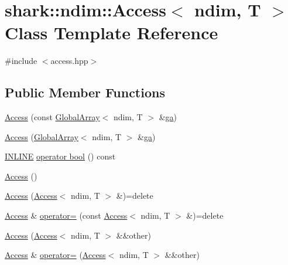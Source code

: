 \hypertarget{classshark_1_1ndim_1_1_access}{}\section{shark\+:\+:ndim\+:\+:Access$<$ ndim, T $>$ Class Template Reference}
\label{classshark_1_1ndim_1_1_access}


{\ttfamily \#include $<$access.\+hpp$>$}

\subsection*{Public Member Functions}
\begin{DoxyCompactItemize}
\item 
\hyperlink{classshark_1_1ndim_1_1_access_a4d5c793cce84924fc4f8a0f8ce0ac780}{Access} (const \hyperlink{classshark_1_1ndim_1_1_global_array}{Global\+Array}$<$ ndim, T $>$ \&\hyperlink{classshark_1_1ndim_1_1_access_abc59e261a07fcecc3f1db641ef04efa7}{ga})
\item 
\hyperlink{classshark_1_1ndim_1_1_access_a228d7e275cbb011b48e6d7cb76f8479d}{Access} (\hyperlink{classshark_1_1ndim_1_1_global_array}{Global\+Array}$<$ ndim, T $>$ \&\hyperlink{classshark_1_1ndim_1_1_access_abc59e261a07fcecc3f1db641ef04efa7}{ga})
\item 
\hyperlink{common_8hpp_a2eb6f9e0395b47b8d5e3eeae4fe0c116}{I\+N\+L\+I\+NE} \hyperlink{classshark_1_1ndim_1_1_access_af1f5644abd12d6affaf5f52db26ce512}{operator bool} () const
\item 
\hyperlink{classshark_1_1ndim_1_1_access_a629b4a756aba5363d6172d01e4b8cb77}{Access} ()
\item 
\hyperlink{classshark_1_1ndim_1_1_access_a1d9ce46490a545c00c2327963428aa00}{Access} (\hyperlink{classshark_1_1ndim_1_1_access}{Access}$<$ ndim, T $>$ \&)=delete
\item 
\hyperlink{classshark_1_1ndim_1_1_access}{Access} \& \hyperlink{classshark_1_1ndim_1_1_access_a8bda6b272af845c56891d06343b686f2}{operator=} (const \hyperlink{classshark_1_1ndim_1_1_access}{Access}$<$ ndim, T $>$ \&)=delete
\item 
\hyperlink{classshark_1_1ndim_1_1_access_abbc49fde47e1da6c01ca28ee881544a8}{Access} (\hyperlink{classshark_1_1ndim_1_1_access}{Access}$<$ ndim, T $>$ \&\&other)
\item 
\hyperlink{classshark_1_1ndim_1_1_access}{Access} \& \hyperlink{classshark_1_1ndim_1_1_access_a221dbc68423570496fd0e1069af4b3d1}{operator=} (\hyperlink{classshark_1_1ndim_1_1_access}{Access}$<$ ndim, T $>$ \&\&other)

\end{DoxyCompactItemize}
